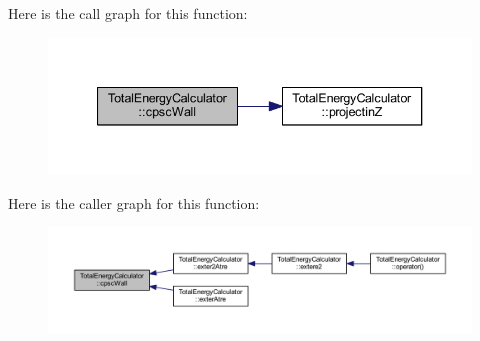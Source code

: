 Here is the call graph for this function\+:\nopagebreak
\begin{figure}[H]
\begin{center}
\leavevmode
\includegraphics[width=340pt]{class_total_energy_calculator_a5a8e2104a52069da69d55e8e73b912e1_cgraph}
\end{center}
\end{figure}




Here is the caller graph for this function\+:\nopagebreak
\begin{figure}[H]
\begin{center}
\leavevmode
\includegraphics[width=350pt]{class_total_energy_calculator_a5a8e2104a52069da69d55e8e73b912e1_icgraph}
\end{center}
\end{figure}


